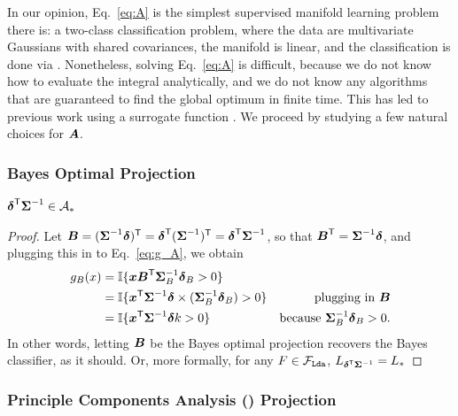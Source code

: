 \documentclass[10pt]{article}
\begin{document}
In our opinion, Eq.~\eqref{eq:A} is the simplest supervised manifold learning problem there is: a two-class classification problem, where the data are multivariate Gaussians with shared covariances, the manifold is linear, and the classification is done via \Lda.
Nonetheless, solving Eq.~\eqref{eq:A} is difficult, because we do not know how to evaluate the integral analytically, and we do not know any algorithms that are guaranteed to find the global optimum in finite time.  This has led to previous work using a surrogate function \cite{not sure who}.  
We proceed by studying a few natural choices for $\boldsymbol{A}$.





\subsubsection{Bayes Optimal Projection}

\begin{lem}
$\boldsymbol{\delta}^{\mathsf{T}}  \boldsymbol{\Sigma}^{-1} \in \mathcal{A}_*$
\end{lem}

\begin{proof}
Let $\boldsymbol{B} = (\boldsymbol{\Sigma}^{-1} \boldsymbol{\delta})^{\mathsf{T}} = \boldsymbol{\delta}^{\mathsf{T}} (\boldsymbol{\Sigma}^{-1})^{\mathsf{T}} = \boldsymbol{\delta}^{\mathsf{T}} \boldsymbol{\Sigma}^{-1}$, so that $\boldsymbol{B}^{\mathsf{T}} = \boldsymbol{\Sigma}^{-1} \boldsymbol{\delta}$,
and plugging this in to Eq.~\eqref{eq:g_A}, we obtain
\begin{align*}
g_{B}(x) &= \mathbb{I} \{ \boldsymbol{x} \boldsymbol{B}^{\mathsf{T}}  \boldsymbol{\Sigma}^{-1}_{B} \boldsymbol{\delta}_{B} > 0\} &
\\&= \mathbb{I} \{ \boldsymbol{x}^{\mathsf{T}} \boldsymbol{\Sigma}^{-1} \boldsymbol{\delta} \times (\boldsymbol{\Sigma}^{-1}_{B} \boldsymbol{\delta}_{B}) > 0\} & \text{plugging in $\boldsymbol{B}$}
\\&= \mathbb{I} \{ \boldsymbol{x}^{\mathsf{T}} \boldsymbol{\Sigma}^{-1} \boldsymbol{\delta} k > 0\} & \text{because $\boldsymbol{\Sigma}^{-1}_{B} \boldsymbol{\delta}_{B} > 0$}.
\end{align*}
In other words, letting $\boldsymbol{B}$ be the Bayes optimal projection recovers the Bayes classifier, as it should.
Or, more formally, for any $F \in \mathcal{F}_{{\sc \texttt{Lda}}}$, $L_{\boldsymbol{\delta}^{\mathsf{T}} \boldsymbol{\Sigma}^{-1}} = L_*$ 
\end{proof}

\subsubsection{Principle Components Analysis (\Pca) Projection}
\end{document}
